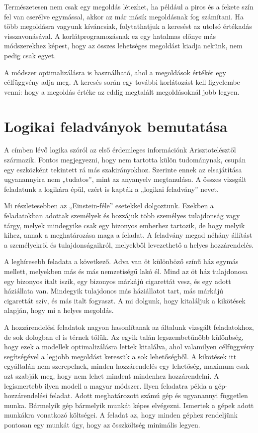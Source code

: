 \documentclass[12pt,a4paper,twoside, openright]{report}
\begin{document}
    Természetesen nem csak egy megoldás létezhet, ha például a piros és a fekete szín fel van cserélve egymással, akkor az már másik megoldásnak fog számítani.
    Ha több megoldásra vagyunk kíváncsiak, folytathatjuk a keresést az utolsó értékadás visszavonásával.
    A korlátprogramozásnak ez egy hatalmas előnye más módszerekhez képest, hogy az összes lehetséges megoldást kiadja nekünk, nem pedig csak egyet.
    
    A módszer optimalizálásra is használható, ahol a megoldások értékét egy célfüggvény adja meg.
    A keresés során egy további korlátozást kell figyelembe venni: hogy a megoldás értéke az eddig megtalált megoldásoknál jobb legyen.


\section{Logikai feladványok bemutatása}

    A címben lévő logika szóról az első érdemleges információnk Arisztotelésztől származik.
    Fontos megjegyezni, hogy nem tartotta külön tudománynak, csupán egy eszközként tekintett rá más szakirányokhoz.
    Szerinte ennek az elsajátítása ugyanannyira nem „tudatos”, mint az anyanyelv megtanulása.\cite{logic}
    A összes vizsgált feladatunk a logikára épül, ezért is kapták a „logikai feladvány” nevet.
    
    Mi részletesebben az „Einstein-féle” esetekkel\cite{logicpuzzles} dolgoztunk.
    Ezekben a feladatokban adottak személyek és hozzájuk több személyes tulajdonság vagy tárgy, melyek mindegyike csak egy bizonyos emberhez tartozik, de hogy melyik kihez, annak a meghatározása maga a feladat.
    A feladvány megad néhány állítást a személyekről és tulajdonságaikról, melyekből levezethető a helyes hozzárendelés.
    
    A leghíresebb feladata a következő.
    Adva van öt különböző színű ház egymás mellett, melyekben más és más nemzetiségű lakó él.
    Mind az öt ház tulajdonosa egy bizonyos italt iszik, egy bizonyos márkájú cigarettát vesz, és egy adott háziállata van.
    Mindegyik tulajdonos más háziállatot tart, más márkájú cigarettát szív, és más italt fogyaszt.
    A mi dolgunk, hogy kitaláljuk a kikötések alapján, hogy mi a helyes megoldás.

    A hozzárendelési feladatok nagyon hasonlítanak az általunk vizsgált feladatokhoz, de sok dologban el is térnek tőlük.
    Az egyik talán legszembetűnőbb különbség, hogy ezek a modellek optimalizálásra lettek kitalálva, ahol valamilyen célfüggvény segítségével a legjobb megoldást keressük a sok lehetőségből.
    A kikötések itt egyáltalán nem szerepelnek, minden hozzárendelés egy lehetőség, maximum csak azt szabják meg, hogy nem lehet mindent mindenhez hozzárendelni.
    A legismertebb ilyen modell a magyar módszer\cite{magyarmodszer}.
    Ilyen feladatra példa a gép-hozzárendelési feladat.
    Adott meghatározott számú gép és ugyanannyi független munka.
    Bármelyik gép bármelyik munkát képes elvégezni.
    Ismertek a gépek adott munkákra vonatkozó költségei.
    A feladat az, hogy minden géphez rendeljünk pontosan egy munkát úgy, hogy az összköltség minimális legyen.
\end{document}
